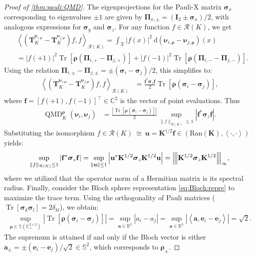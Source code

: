\documentclass[noinfoline]{imsart}\setcounter{tocdepth}{2}
\renewcommand{\b}[1]{\mathbb{#1}} %
\newcommand{\m}[1]{\mathbf{#1}} %
\renewcommand{\c}[1]{\mathcal{#1}} %
\newcommand{\mb}[1]{\boldsymbol{#1}} %
\newcommand{\rd}{\mathrm{d}} %
\newcommand{\tr}[1]{\operatorname{Tr}\left[#1\right]}
\newcommand{\vertiii}[1]{{\left\vert\kern-0.25ex\left\vert\kern-0.25ex\left\vert #1 
    \right\vert\kern-0.25ex\right\vert\kern-0.25ex\right\vert}} %
\newcommand{\innpr}[2]{{\left\langle {#1},{#2}\right\rangle}} %
\newcommand{\QMD}{\operatorname{QMD}}
\theoremstyle{plain}
\begin{document}
\begin{appendix}
\begin{proof}[Proof of \cref{thm:pauli:QMD}]
The eigenprojections for the Pauli-X matrix $\mb{\sigma}_{x}$ corresponding to eigenvalues $\pm 1$ are given by $\m{\Pi}_{x, \pm} = (\m{I}_{2} \pm \mb{\sigma}_{x})/2$, with analogous expressions for $\mb{\sigma}_{y}$ and $\mb{\sigma}_{z}$.  
For any function $f \in \c{R}(K)$, we get
\begin{align*}
    &\innpr{(\m{T}_{K}^{\mb{\nu}_{i, \mb{\rho}}} - \m{T}_{K}^{\mb{\nu}_{j, \mb{\rho}}}) f}{f}_{\c{R}(K)} 
    = \int_{X} |f(x)|^{2} \ \rd (\mb{\nu}_{i, \mb{\rho}}-\mb{\nu}_{j, \mb{\rho}})(x) \\
    &= |f(+1)|^{2} \tr{\mb{\rho} (\m{\Pi}_{i, +}- \m{\Pi}_{j, +})} + |f(-1)|^{2} \tr{\mb{\rho} (\m{\Pi}_{i, -}- \m{\Pi}_{j, -})}.
\end{align*}
Using the relation $\m{\Pi}_{i, \pm} - \m{\Pi}_{j, \pm} = \pm (\mb{\sigma}_{i} - \mb{\sigma}_{j})/2$, this simplifies to:
\begin{align*}
    \innpr{(\m{T}_{K}^{\mb{\nu}_{i, \mb{\rho}}} - \m{T}_{K}^{\mb{\nu}_{j, \mb{\rho}}}) f}{f}_{\c{R}(K)} 
    &= \frac{\m{f}^{*} \mb{\sigma}_{z} \m{f}}{2} \tr{\mb{\rho} (\mb{\sigma}_{i} - \mb{\sigma}_{j})},
\end{align*}
where $\m{f} = [f(+1), f(-1)]^{\top} \in \b{C}^{2}$ is the vector of point evaluations. Thus
\begin{align*}
    \QMD_{K}^{\mb{\rho}}(\mb{\nu}_{i}, \mb{\nu}_{j}) 
    &= \frac{|\tr{\mb{\rho} (\mb{\sigma}_{i} - \mb{\sigma}_{j})}|}{2} \sup_{\|f\|_{\c{R}(K)} \le 1} \left| \m{f}^* \mb{\sigma}_z \m{f} \right|.
\end{align*}
Substituting the isomorphism $f \in \c{R}(K) \ \cong \ \m{u} = \m{K}^{\dagger/2} \m{f} \in (\text{Ran}(\m{K}), \innpr{\cdot}{\cdot})$ yields:
\begin{align*}
    \sup_{\|f\|_{\c{R}(K)} \le 1} \left| \m{f}^* \mb{\sigma}_z \m{f} \right| = \sup_{\|\m{u}\| \le 1} \left| \m{u}^* \m{K}^{1/2} \mb{\sigma}_{z} \m{K}^{1/2} \m{u} \right| 
    = \vertiii{\m{K}^{1/2} \mb{\sigma}_{z} \m{K}^{1/2}}_{\infty},
\end{align*}
where we utilized that the operator norm of a Hermitian matrix is its spectral radius.
Finally, consider the Bloch sphere representation \eqref{eq:Bloch:repre} to maximize the trace term. Using the orthogonality of Pauli matrices ($\tr{\mb{\sigma}_k \mb{\sigma}_l} = 2\delta_{kl}$), we obtain:
\begin{align*}
    \sup_{\mb{\rho} \in \b{S}(\b{C}_{+}^{2 \times 2})} |\tr{\mb{\rho} (\mb{\sigma}_{i} - \mb{\sigma}_{j})}| = \sup_{\m{a} \in \b{B}^{3}} |a_{i} - a_{j}| = \sup_{\m{a} \in \b{B}^{3}} |\innpr{\m{a}}{\m{e}_{i} - \m{e}_{j}}| = \sqrt{2}.
\end{align*}
The supremum is attained if and only if the Bloch vector is either $\m{a}_{\pm} = \pm (\m{e}_{i} - \m{e}_{j})/\sqrt{2} \in \b{S}^{2}$, which corresponds to $\mb{\rho}_\pm$.
\end{proof}



\end{appendix}
\end{document}
